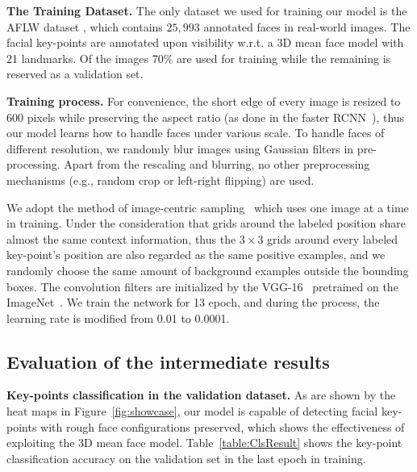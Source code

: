 \documentclass[runningheads]{llncs}
\begin{document}
\textbf{The Training Dataset.} The only dataset we used for training our model is the AFLW dataset \cite{AFLW}, which contains $25,993$ annotated faces in real-world images. The facial key-points are annotated upon visibility w.r.t. a 3D mean face model with 21 landmarks.  Of the images 70\% are used for training while the remaining is reserved as  a validation set.

\textbf{Training process.} For convenience, the short edge of every image is resized to 600 pixels while preserving the aspect ratio (as done in the faster RCNN~\cite{FasterRCNN}), thus our model learns how to handle faces under various scale. To handle faces of different resolution, we randomly blur images using Gaussian filters in pre-processing. Apart from the rescaling and blurring, no other preprocessing mechanisms (e.g., random crop or left-right flipping) are used. 

We adopt the method of image-centric sampling~\cite{FastRCNN,FasterRCNN} which uses one image at a time in training. Under the consideration that grids around the labeled position share almost the same context information, thus the $3\times3$ grids around every labeled key-point's position are also regarded as the same positive examples, and we randomly choose the same amount of background examples outside the bounding boxes. The convolution filters are initialized by the VGG-16~\cite{VGG} pretrained on the ImageNet~\cite{ImageNet}. We train the network for 13 epoch, and during the process, the learning rate is modified from 0.01 to 0.0001.

\subsection{Evaluation of the intermediate results}
\textbf{Key-points classification in the validation dataset.} As are shown by the heat maps in Figure~\ref{fig:showcase}, our model is capable of detecting facial key-points with rough face configurations preserved, which shows the effectiveness of exploiting the 3D mean face model. Table~\ref{table:ClsResult} shows the key-point classification accuracy  on the validation set in the last epoch in training.
\end{document}
